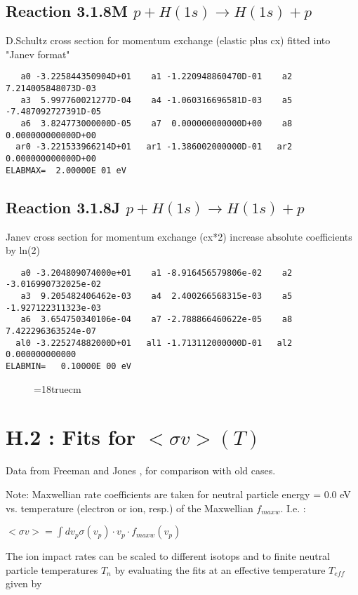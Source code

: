 \subsection{
Reaction 3.1.8M $  p + H(1s) \rightarrow H(1s) + p  $
}
D.Schultz cross section for momentum exchange (elastic plus cx)
fitted into "Janev format"

\begin{verbatim}
   a0 -3.225844350904D+01    a1 -1.220948860470D-01    a2  7.214005848073D-03
   a3  5.997760021277D-04    a4 -1.060316696581D-03    a5 -7.487092727391D-05
   a6  3.824773000000D-05    a7  0.000000000000D+00    a8  0.000000000000D+00
  ar0 -3.221533966214D+01   ar1 -1.386002000000D-01   ar2  0.000000000000D+00
ELABMAX=  2.00000E 01 eV
\end{verbatim}
\subsection{
Reaction 3.1.8J $  p + H(1s) \rightarrow H(1s) + p  $
}
Janev cross section for momentum exchange (cx*2)
increase absolute coefficients by ln(2)

\begin{verbatim}
   a0 -3.204809074000e+01    a1 -8.916456579806e-02    a2 -3.016990732025e-02
   a3  9.205482406462e-03    a4  2.400266568315e-03    a5 -1.927122311323e-03
   a6  3.654750340106e-04    a7 -2.788866460622e-05    a8  7.422296363524e-07
  al0 -3.225274882000D+01   al1 -1.713112000000D-01   al2  0.000000000000
ELABMIN=   0.10000E 00 eV
\end{verbatim}

\begin{figure} \label{318RS}
\epsfxsize=18truecm
\end{figure}
\newpage

\section{H.2 :  Fits for $<\sigma v> (T)$}

\bigskip
Data from Freeman and Jones \cite{kn:Freeman},
for comparison with old cases.

Note: Maxwellian rate coefficients are taken for neutral particle energy = 0.0 eV
vs. temperature (electron or ion, resp.) of the Maxwellian $f_{maxw}$.
I.e. :

$<\sigma v> = \int dv_p \sigma(v_{p}) \cdot v_{p} \cdot f_{maxw}(v_{p})
$

The ion impact rates can be scaled to different isotops and to finite
neutral particle temperatures $T_n$ by evaluating the fits at an
effective temperature $T_{eff}$ given by

